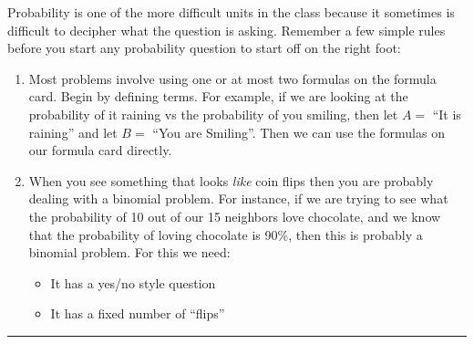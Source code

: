 \documentclass[landscape]{article}
\newcommand{\myline}{\vspace{4pt}\hrule  \vspace{4pt}}
\newenvironment{topic}[1]{
	\noindent \textbf{\textsc{\color{harvardcrimson}{#1}}}
	\noindent \hspace{-3.5pt}
}{
	\myline
}
\newenvironment{compactitem}{
	\begin{itemize}[leftmargin=*,labelsep=5pt]
	}{
	\end{itemize}
}
\newenvironment{compactenum}{
	\begin{enumerate}[leftmargin=*,labelsep=5pt]
	}{
	\end{enumerate}
}
\begin{document}
\begin{multicols*}{3}
	\begin{topic}{General Probability Questions}
		Probability is one of the more difficult units in the class because it sometimes is difficult to decipher what the question is asking. Remember a few simple rules before you start any probability question to start off on the right foot:
		\begin{compactenum}
			\item Most problems involve using one or at most two formulas on the formula card. Begin by defining terms. For example, if we are looking at the probability of it raining vs the probability of you smiling, then let $ A =$ ``It is raining'' and let $ B =  $ ``You are Smiling''. Then we can use the formulas on our formula card directly.
			\item When you see something that looks \textit{like} coin flips then you are probably dealing with a binomial problem. For instance, if we are trying to see what the probability of 10 out of our 15 neighbors love chocolate, and we know that the probability of loving chocolate is 90\%, then this is probably a binomial problem. For this we need:
			\begin{compactitem}
				\item It has a yes/no style question
				\item It has a fixed number of ``flips'' 
			\end{compactitem}
		\end{compactenum}
	\end{topic}
	

\end{multicols*}
\end{document}
